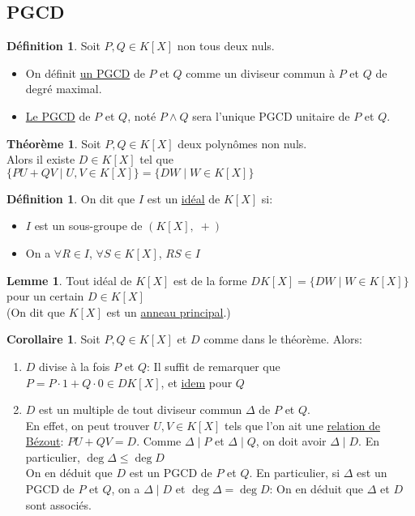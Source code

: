 \documentclass[10pt,a4paper]{article}
\theoremstyle{definition}
\newtheorem{theorem}[proposition]{Théorème}
\newtheorem{corollaire}[proposition]{Corollaire}
\newtheorem{lemme}[proposition]{Lemme}
\newtheorem{definition}[proposition]{Définition}
\begin{document}
\subsection{PGCD}
\begin{definition}
Soit $P, Q \in K[X]$ non tous deux nuls.
\begin{itemize}
\item On définit \uline{un PGCD} de $P$ et $Q$ comme un diviseur commun à $P$ et $Q$ de degré maximal.
\item \uline{Le PGCD} de $P$ et $Q$, noté $P \wedge Q$ sera l'unique PGCD unitaire de $P$ et $Q$.
\end{itemize}
\end{definition}
\begin{theorem}
Soit $P, Q \in K[X]$ deux polynômes non nuls. \\
Alors il existe $D \in K[X]$ tel que $\{ PU + QV \mid U, V \in K[X] \} = \{ DW \mid W \in K[X] \}$
\end{theorem}
\begin{definition}
On dit que $I$ est un \uline{idéal} de $K[X]$ si:
\begin{itemize}
\item $I$ est un sous-groupe de $(K[X], \; +)$
\item On a $\forall R \in I$, $\forall S \in K[X]$, $RS \in I$
\end{itemize}
\end{definition}
\begin{lemme}
Tout idéal de $K[X]$ est de la forme $DK[X] = \{ DW \mid W \in K[X] \}$ pour un certain $D \in K[X]$ \\
(On dit que $K[X]$ est un \uline{anneau principal}.)
\end{lemme}
\begin{corollaire}
Soit $P,Q \in K[X]$ et $D$ comme dans le théorème. Alors:
\begin{enumerate}
\item $D$ divise à la fois $P$ et $Q$: Il suffit de remarquer que $P = P \cdot 1 + Q \cdot 0 \in DK[X]$, et \uline{idem} pour $Q$
\item $D$ est un multiple de tout diviseur commun $\Delta$ de $P$ et $Q$. \\
En effet, on peut trouver $U, V \in K[X]$ tels que l'on ait une \uline{relation de Bézout}: $PU + QV = D$. Comme $\Delta \mid P$ et $\Delta \mid Q$, on doit avoir $\Delta \mid D$. En particulier, $\deg{\Delta} \leq \deg{D}$ \\
On en déduit que $D$ est un PGCD de $P$ et $Q$. En particulier, si $\Delta$ est un PGCD de $P$ et $Q$, on a $\Delta \mid D$ et $\deg{\Delta} = \deg{D}$: On en déduit que $\Delta$ et $D$ sont associés.
\end{enumerate}
\end{corollaire}
\end{document}
